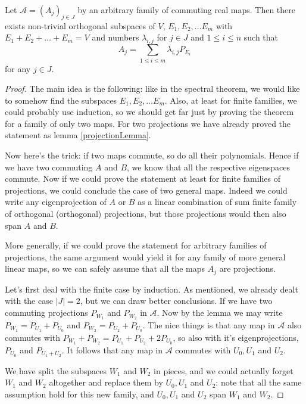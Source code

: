 \begin{lause}\label{commuting_real_maps}
	Let $\mathcal{A} = (A_{j})_{j \in J}$ by an arbitrary family of commuting real maps. Then there exists non-trivial orthogonal subspaces of $V$, $E_{1}, E_{2}, \ldots E_{m}$ with $E_{1} + E_{2} + \ldots + E_{m} = V$ and numbers $\lambda_{i, j}$ for $j \in J$ and $1 \leq i \leq n$ such that
	\[
		A_{j} = \sum_{1 \leq i \leq m} \lambda_{i, j} P_{E_{i}}
	\]
	for any $j \in J$.
\end{lause}
\begin{proof}
	The main idea is the following: like in the spectral theorem, we would like to somehow find the subspaces $E_{1}, E_{2}, \ldots E_{m}$. Also, at least for finite families, we could probably use induction, so we should get far just by proving the theorem for a family of only two maps. For two projections we have already proved the statement as lemma \ref{projectionLemma}.

	Now here's the trick: if two maps commute, so do all their polynomials. Hence if we have two commuting $A$ and $B$, we know that all the respective eigenspaces commute. Now if we could prove the statement at least for finite families of projections, we could conclude the case of two general maps. Indeed we could write any eigenprojection of $A$ or $B$ as a linear combination of sum finite family of orthogonal (orthogonal) projections, but those projections would then also span $A$ and $B$.

	More generally, if we could prove the statement for arbitrary families of projections, the same argument would yield it for any family of more general linear maps, so we can safely assume that all the maps $A_{j}$ are projections.

	Let's first deal with the finite case by induction. As mentioned, we already dealt with the case $|J| = 2$, but we can draw better conclusions. If we have two commuting projections $P_{W_{1}}$ and $P_{W_{2}}$ in $\mathcal{A}$. Now by the lemma we may write $P_{W_{1}} = P_{U_{1}} + P_{U_{0}}$ and $P_{W_{2}} = P_{U_{2}} + P_{U_{0}}$. The nice things is that any map in $\mathcal{A}$ also commutes with $P_{W_{1}} + P_{W_{2}} = P_{U_{1}} + P_{U_{2}} + 2 P_{U_{0}}$, so also with it's eigenprojections, $P_{U_{0}}$ and $P_{U_{1} + U_{2}}$. It follows that any map in $\mathcal{A}$ commutes with $U_{0}, U_{1}$ and $U_{2}$.

	We have split the subspaces $W_{1}$ and $W_{2}$ in pieces, and we could actually forget $W_{1}$ and $W_{2}$ altogether and replace them by $U_{0}, U_{1}$ and $U_{2}$: note that all the same assumption hold for this new family, and $U_{0}, U_{1}$ and $U_{2}$ span $W_{1}$ and $W_{2}$.


\end{proof}
